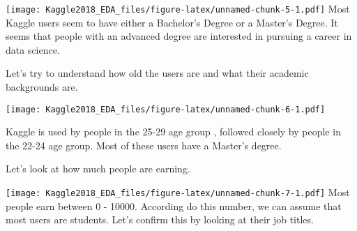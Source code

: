\documentclass[]{article}
\newenvironment{Shaded}{\begin{snugshade}}{\end{snugshade}}
\newcommand{\KeywordTok}[1]{\textcolor[rgb]{0.13,0.29,0.53}{\textbf{{#1}}}}
\newcommand{\DataTypeTok}[1]{\textcolor[rgb]{0.13,0.29,0.53}{{#1}}}
\newcommand{\DecValTok}[1]{\textcolor[rgb]{0.00,0.00,0.81}{{#1}}}
\newcommand{\FloatTok}[1]{\textcolor[rgb]{0.00,0.00,0.81}{{#1}}}
\newcommand{\StringTok}[1]{\textcolor[rgb]{0.31,0.60,0.02}{{#1}}}
\newcommand{\NormalTok}[1]{{#1}}
\begin{document}
\texttt{[image: Kaggle2018\_EDA\_files/figure-latex/unnamed-chunk-5-1.pdf]}
Most Kaggle users seem to have either a Bachelor's Degree or a Master's
Degree. It seems that people with an advanced degree are interested in
pursuing a career in data science.

Let's try to understand how old the users are and what their academic
backgrounds are.

\begin{Shaded}
\end{Shaded}

\texttt{[image: Kaggle2018\_EDA\_files/figure-latex/unnamed-chunk-6-1.pdf]}

Kaggle is used by people in the 25-29 age group , followed closely by
people in the 22-24 age group. Most of these users have a Master's
degree.

Let's look at how much people are earning.

\begin{Shaded}
\end{Shaded}

\texttt{[image: Kaggle2018\_EDA\_files/figure-latex/unnamed-chunk-7-1.pdf]}
Most people earn between 0 - 10000. According do this number, we can
assume that most users are students. Let's confirm this by looking at
their job titles.
\end{document}
